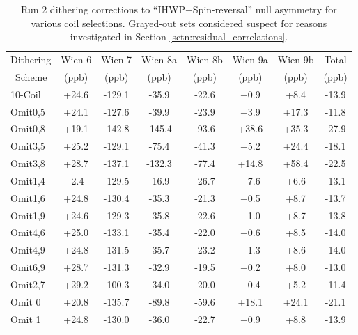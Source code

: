 \begin{table}[!h]

\caption{Run 2 dithering corrections to ``IHWP+Spin-reversal'' null asymmetry for various coil selections. Grayed-out sets considered suspect for reasons investigated in Section \ref{sctn:residual_correlations}.}
\begin{center}
\begin{tabular}[h]{|l||c|c|c|c|c|c||c|}\hline
Dithering& Wien 6& Wien 7& Wien 8a& Wien 8b& Wien 9a& Wien 9b& Total\\
~Scheme&(ppb)&(ppb)&(ppb)&(ppb)&(ppb)&(ppb)&(ppb)\\\hline\hline
10-Coil& +24.6& -129.1& -35.9& -22.6& +0.9& +8.4& -13.9\\\hline
Omit0,5& +24.1& -127.6& -39.9& -23.9& +3.9& +17.3& -11.8\\\hline
{\color{Gray}Omit0,8}&{\color{Gray} +19.1}&{\color{Gray} -142.8}&{\color{Gray} -145.4}&{\color{Gray} -93.6}&{\color{Gray} +38.6}&{\color{Gray} +35.3}&{\color{Gray} -27.9}\\\hline
{\color{Gray}Omit3,5}&{\color{Gray} +25.2}&{\color{Gray} -129.1}&{\color{Gray} -75.4}&{\color{Gray} -41.3}&{\color{Gray} +5.2}&{\color{Gray} +24.4}&{\color{Gray} -18.1}\\\hline
{\color{Gray}Omit3,8}&{\color{Gray} +28.7}&{\color{Gray} -137.1}&{\color{Gray} -132.3}&{\color{Gray} -77.4}&{\color{Gray} +14.8}&{\color{Gray} +58.4}&{\color{Gray} -22.5}\\\hline
{\color{Gray}Omit1,4}&{\color{Gray} -2.4}&{\color{Gray} -129.5}&{\color{Gray} -16.9}&{\color{Gray} -26.7}&{\color{Gray} +7.6}&{\color{Gray} +6.6}&{\color{Gray} -13.1}\\\hline
Omit1,6& +24.8& -130.4& -35.3& -21.3& +0.5& +8.7& -13.7\\\hline
Omit1,9& +24.6& -129.3& -35.8& -22.6& +1.0& +8.7& -13.8\\\hline
Omit4,6& +25.0& -133.1& -35.4& -22.0& +0.6& +8.5& -14.0\\\hline
Omit4,9& +24.8& -131.5& -35.7& -23.2& +1.3& +8.6& -14.0\\\hline
Omit6,9& +28.7& -131.3& -32.9& -19.5& +0.2& +8.0& -13.0\\\hline
Omit2,7& +29.2& -100.3& -34.0& -20.0& +0.4& +5.2& -11.4\\\hline
{\color{Gray}Omit 0}&{\color{Gray} +20.8}&{\color{Gray} -135.7}&{\color{Gray} -89.8}&{\color{Gray} -59.6}&{\color{Gray} +18.1}&{\color{Gray} +24.1}&{\color{Gray} -21.1}\\\hline
Omit 1& +24.8& -130.0& -36.0& -22.7& +0.9& +8.8& -13.9\\\hline

\end{tabular}
\end{center}
\end{table}
